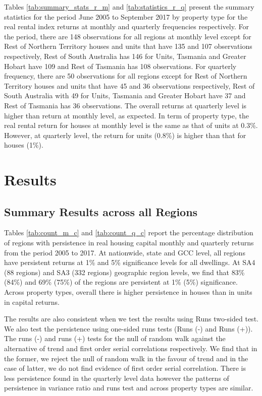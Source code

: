 \documentclass[AEJ,reqno, draftmode]{AEA}
\begin{document}

\restoregeometry


Tables \ref{tab:summary_stats_r_m} and \ref{tab:statistics_r_q} present the summary statistics for the period June 2005 to September 2017 by property type for the real rental index returns at monthly and quarterly frequencies respectively. For the period, there are 148 observations for all regions at monthly level except for Rest of Northern Territory houses and units that have 135 and 107 observations respectively, Rest of South Australia has 146 for Units, Tasmania and Greater Hobart have 109 and Rest of Tasmania has 108 observations. For quarterly frequency, there are 50 observations for all regions except for Rest of Northern Territory houses and units that have 45 and 36 observations respectively, Rest of South Australia with 49 for Units, Tasmania and Greater Hobart have 37 and Rest of Tasmania has 36 observations. The overall returns at quarterly level is higher than return at monthly level, as expected. In term of property type, the real rental return for houses at monthly level is the same as that of units at 0.3\%. However, at quarterly level, the return for units (0.8\%) is higher than that for houses (1\%).


\restoregeometry


\section{Results}

\subsection{Summary Results across all Regions}


Tables \ref{tab:count_m_c} and \ref{tab:count_q_c} report the percentage distribution of regions with persistence in real housing capital monthly and quarterly returns from the period 2005 to 2017. At nationwide, state and GCC level, all regions have persistent returns at 1\% and 5\% significance levels for all dwellings. At SA4 (88 regions) and SA3 (332 regions) geographic region levels, we find that 83\% (84\%) and 69\% (75\%) of the regions are persistent at 1\% (5\%) significance. Across property types, overall there is higher persistence in houses than in units in capital returns.

The results are also consistent when we test the results using Runs two-sided test. We also test the persistence using one-sided runs tests (Runs (-) and Runs (+)). The runs (-) and runs (+) tests for the null of random walk against the alternative of trend and first order serial correlations respectively. We find that in the former, we reject the null of random walk in the favour of trend and in the case of latter, we do not find evidence of first order serial correlation. There is less persistence found in the quarterly level data however the patterns of persistence in variance ratio and runs test and across property types are similar.
\end{document}
